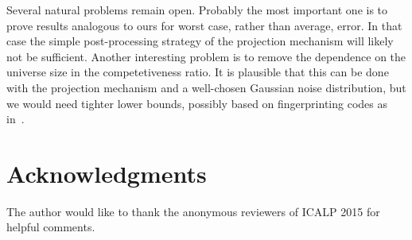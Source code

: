 \documentclass{article}
\begin{document}
Several natural problems remain open. Probably the most important one
is to prove results analogous to ours for worst case, rather than
average, error. In that case the simple post-processing strategy of
the projection mechanism will likely not be sufficient. Another
interesting problem is to remove the dependence on the universe size
in the competetiveness ratio. It is plausible that this can be done
with the projection mechanism and a well-chosen Gaussian noise
distribution, but we would need tighter lower bounds, possibly based
on fingerprinting codes as in~\cite{BunUV13}.

\section*{Acknowledgments}
The author would like to thank the anonymous reviewers of ICALP 2015 for helpful comments.



\end{document}

